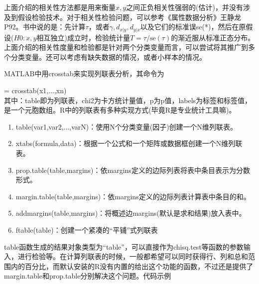             上面介绍的相关性方法都是用来衡量$x,y$之间正负相关性强弱的(估计)，并没有涉及到假设检验技术。对于相关性检验问题，可以参考《属性数据分析》王静龙P92。书中说的是：先计算$\tau$，或者$\gamma,d_{x|y},d_{y|x}$以及它们的标准误se(*)，然后在原假设($H0:x,y$相互独立)成立时，检验统计量$T = \tau/\mathrm{se}(\tau)$的渐近服从标准正态分布。上面介绍的相关性度量和检验都是针对两个分类变量而言，可以尝试将其推广到多个分类变量。还可以考虑有缺失数据的情况，或者小样本的情况。
            \par
            MATLAB中用crosstab来实现列联表分析，其命令为
            \par
            [table,chi2,p,labels] = crosstab(x1,...,xn)\\
            其中：table即为列联表，chi2为卡方统计量值，p为p值，labels为标签和标签值，是一个元胞数组。R中的列联表有多种实现方式(毕竟R是专业统计工具嘛)。
            \begin{enumerate}
            \item table(var1,var2,$\dots$,varN)：使用N个分类变量(因子)创建一个N维列联表。
            \item xtabs(formula,data)：根据一个公式和一个矩阵或数据框创建一个N维列联表。
            \item prop.table(table,margins)：依margins定义的边际列表将表中条目表示为分数形式。
            \item margin.table(table,margins)：依margins定义的边际列表计算表中条目的和。
            \item addmargins(table,margins)：将概述边margins(默认是求和结果)放入表中。
            \item ftable(table)：创建一个紧凑的“平铺”式列联表
            \end{enumerate}
            \par
            table函数生成的结果对象类型为“table”，可以直接作为chisq.test等函数的参数输入，进行检验等。在计算列联表的时候，一般都希望可以同时获得行、列和总和范围内的百分比，而默认安装的R没有内置的给出这个功能的函数，不过还是提供了margin.table和prop.table分别解决这个问题。代码示例
